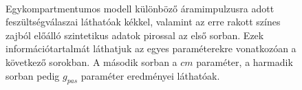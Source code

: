 \begin{figure}[h!]
	\\
	\caption[Különböző protokollok és információtartalmuk]{Egykompartmentumos modell különböző áramimpulzusra adott feszültségválaszai láthatóak kékkel, valamint az erre rakott színes zajból előálló szintetikus adatok pirossal az első sorban. Ezek információtartalmát láthatjuk az egyes paraméterekre vonatkozóan a következő sorokban. A második sorban a $cm$ paraméter, a harmadik sorban pedig $g_{pas}$ paraméter eredményei láthatóak.}
	\label{fig:protocol}
\end{figure}



